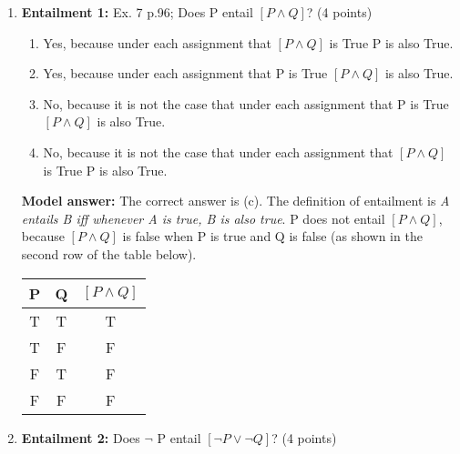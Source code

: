 \documentclass[a4,11pt]{article}
\newcommand{\6}{\mbox{$[\hspace*{-.6mm}[$}}
\newcommand{\9}{\mbox{$]\hspace*{-.6mm}]$}}
\begin{document}
\begin{enumerate}[leftmargin = 12pt]
\begin{enumerate}
\item T T T F equivalent
\item T T T F not equivalent
\item T F T F equivalent
\item T F T F not equivalent
\item T F T F equivalent
\item F F T F not equivalent
\end{enumerate}


{ \bf Model answer:} The correct answer is {\it T T T F equivalent}. The formulae are equivalent because they have the same truth values under every assignment.

\item {\bf Entailment 1:} Ex. 7 p.96; Does P entail $[P \land Q]$? (4 points)

\begin{enumerate}[noitemsep]
\item Yes, because under each assignment that $[P \land Q]$ is True P is also True.
\item Yes, because under each assignment that P is True $[P \land Q]$ is also True.
\item No, because it is not the case that under each assignment that P is True $[P \land Q]$ is also True.
\item No, because it is not the case that under each assignment that $[P \land Q]$ is True P is also True.
\end{enumerate}

{ \bf Model answer:}  The correct answer is (c). The definition of entailment is {\it A entails B iff whenever A is true, B is also true}. P does not entail $[P \land Q]$, because $[P \land Q]$ is false when P is true and Q is false (as shown in the second row of the table below).

\begin{tabular}{c | c | c }
\hline \hline
P & Q &  $[P \land Q]$  \\
\hline
T & T & T \\
 T & F & F \\
F & T & F \\
F & F & F \\
\hline \hline
\end{tabular}

\item  {\bf Entailment 2:} Does $\neg$ P entail $[ \neg P \lor \neg Q ]$? (4 points)


\end{enumerate}
\end{document}
